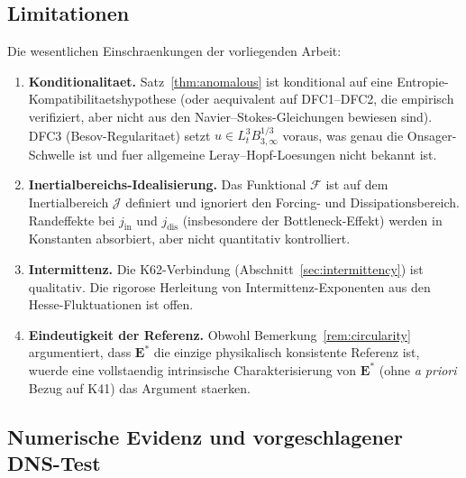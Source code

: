 \documentclass[12pt,a4paper]{article}
\theoremstyle{definition}
\theoremstyle{plain}
\theoremstyle{remark}
\begin{document}
\subsection{Limitationen}

Die wesentlichen Einschraenkungen der vorliegenden Arbeit:
\begin{enumerate}
\item \textbf{Konditionalitaet.}\; Satz~\ref{thm:anomalous} ist konditional
  auf eine Entropie-Kompatibilitaetshypothese (oder aequivalent auf
  DFC1--DFC2, die empirisch verifiziert, aber nicht aus den
  Navier--Stokes-Gleichungen bewiesen sind). DFC3 (Besov-Regularitaet)
  setzt $u \in L^3_t B^{1/3}_{3,\infty}$ voraus, was genau die
  Onsager-Schwelle ist und fuer allgemeine Leray--Hopf-Loesungen nicht
  bekannt ist.
\item \textbf{Inertialbereichs-Idealisierung.}\; Das Funktional $\mathcal{F}$
  ist auf dem Inertialbereich $\mathcal{J}$ definiert und ignoriert den
  Forcing- und Dissipationsbereich. Randeffekte bei $j_{\mathrm{in}}$ und
  $j_{\mathrm{dis}}$ (insbesondere der Bottleneck-Effekt) werden in
  Konstanten absorbiert, aber nicht quantitativ kontrolliert.
\item \textbf{Intermittenz.}\; Die K62-Verbindung
  (Abschnitt~\ref{sec:intermittency}) ist qualitativ. Die rigorose
  Herleitung von Intermittenz-Exponenten aus den Hesse-Fluktuationen ist
  offen.
\item \textbf{Eindeutigkeit der Referenz.}\; Obwohl
  Bemerkung~\ref{rem:circularity} argumentiert, dass $\mathbf{E}^*$ die
  einzige physikalisch konsistente Referenz ist, wuerde eine vollstaendig
  intrinsische Charakterisierung von $\mathbf{E}^*$ (ohne \emph{a priori}
  Bezug auf K41) das Argument staerken.
\end{enumerate}

\subsection{Numerische Evidenz und vorgeschlagener DNS-Test}
\end{document}
